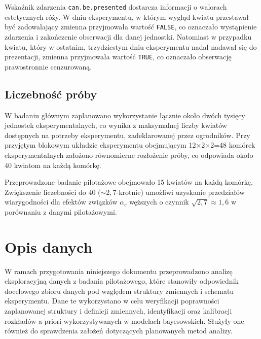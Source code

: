 \documentclass[12pt, a4paper]{article}
\begin{document}
Wskaźnik zdarzenia \texttt{can.be.presented} dostarcza informacji o walorach estetycznych róży. W dniu eksperymentu, w którym wygląd kwiatu przestawał być zadowalający zmienna przyjmowała wartość \texttt{FALSE}, co oznaczało wystąpienie zdarzenia i zakończenie obserwacji dla danej jednostki. Natomiast w przypadku kwiatu, który w ostatnim, trzydziestym dniu eksperymentu nadal nadawał się do prezentacji, zmienna przyjmowała wartość \texttt{TRUE}, co oznaczało obserwację prawostronnie cenzurowaną.

\subsection{Liczebność próby}
W badaniu głównym zaplanowano wykorzystanie łącznie około dwóch tysięcy jednostek eksperymentalnych, co wynika z maksymalnej liczby kwiatów dostępnych na potrzeby eksperymentu, zadeklarowanej przez ogrodników. Przy przyjętym blokowym układzie eksperymentu obejmującym 12×2×2=48 komórek eksperymentalnych założono równomierne rozłożenie próby, co odpowiada około 40 kwiatom na każdą komórkę.

\par Przeprowadzone badanie pilotażowe obejmowało 15 kwiatów na każdą komórkę. Zwiększenie liczebności do 40 ($\sim 2{,}7$-krotnie) umożliwi uzyskanie przedziałów wiarygodności dla efektów związków $\alpha_c$ węższych o czynnik $\sqrt{2{,}7} \approx 1{,}6$ w porównaniu z danymi pilotażowymi.
\section{Opis danych}
W ramach przygotowania niniejszego dokumentu przeprowadzono analizę eksploracyjną danych z badania pilotażowego, które stanowiły odpowiednik docelowego zbioru danych pod względem struktury zmiennych i schematu eksperymentu. Dane te wykorzystano w celu weryfikacji poprawności zaplanowanej struktury i definicji zmiennych, identyfikacji oraz kalibracji rozkładów a priori wykorzystywanych w modelach bayesowskich. Służyły one również do sprawdzenia założeń dotyczących planowanych metod analizy.
\end{document}
